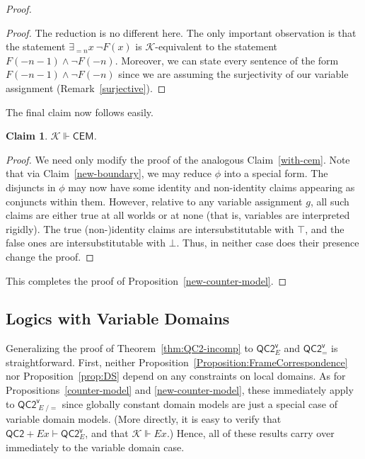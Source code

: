 \documentclass[12pt]{article}
\newtheorem{claim}{Claim}
\newcommand{\ex}{\mathop{\textit{E}}}
\begin{document}
\begin{proof}
\begin{proof}
    The reduction is no different here. 
    The only important observation is that the statement $\exists_{=n} x \ \neg F(x)$ is $\mathcal{K}$-equivalent to the statement $F(-n-1)\wedge \neg F(-n)$. 
    Moreover, we can state every sentence of the form $F(-n-1)\wedge \neg F(-n)$ since we are assuming the surjectivity of our variable assignment (Remark~\ref{surjective}).
\end{proof}

The final claim now follows easily.

\begin{claim}\label{new-with-cem}
    $\mathcal{K} \Vdash \mathsf{CEM}$.
\end{claim}

\begin{proof}
    We need only modify the proof of the analogous Claim~\ref{with-cem}. 
    Note that via Claim~\ref{new-boundary}, we may reduce $\phi$ into a special form. 
    The disjuncts in $\phi$ may now have some identity and non-identity claims appearing as conjuncts within them. 
    However, relative to any variable assignment $g$, all such claims are either true at all worlds or at none (that is, variables are interpreted rigidly). 
    The true (non-)identity claims are intersubstitutable with $\top$, and the false ones are intersubstitutable with $\bot$. 
    Thus, in neither case does their presence change the proof.
\end{proof}
This completes the proof of Proposition~\ref{new-counter-model}.
\end{proof}


\subsection{Logics with Variable Domains}
\label{Subsection:LogicVariableDomains}

Generalizing the proof of Theorem~\ref{thm:QC2-incomp} to $\mathsf{QC2^v_{\ex}}$ and $\mathsf{QC2^v_=}$ is straightforward. 
First, neither Proposition~\ref{Proposition:FrameCorrespondence} nor Proposition~\ref{prop:DS} depend on any constraints on local domains. 
As for Propositions~\ref{counter-model} and \ref{new-counter-model}, these immediately apply to $\mathsf{QC2^v_{\ex/=}}$ since globally constant domain models are just a special case of variable domain models. 
(More directly, it is easy to verify that $\mathsf{QC2}+Ex \vdash \mathsf{QC2^v_{\ex}}$, and that $\mathcal{K} \Vdash Ex$.) 
Hence, all of these results carry over immediately to the variable domain case. 
\end{document}
